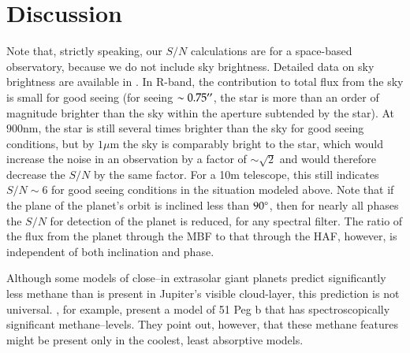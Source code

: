 \section{Discussion}
\label{micro_sec:discussion}
Note that, strictly speaking, our $S/N$ calculations are for a
space-based observatory, because we do not include sky brightness.
Detailed data on sky brightness are available in
\citet{leinert_et_al1998}.  In R-band, the contribution to total flux
from the sky is small for good seeing (for seeing $\sim0.75\mbox{$^{\prime\prime}$}$,
the star is more than an order of magnitude brighter than the sky
within the aperture subtended by the star).  At $900$nm, the star is
still several times brighter than the sky for good seeing conditions,
but by $1\mu$m the sky is comparably bright to the star, which would
increase the noise in an observation by a factor of $\sim\sqrt{2}$ and
would therefore decrease the $S/N$ by the same factor.  For a 10m
telescope, this still indicates $S/N\sim6$ for good seeing conditions
in the situation modeled above.  Note that if the plane of the
planet's orbit is inclined less than $90\mbox{$^\circ$}$, then for nearly all
phases the $S/N$ for detection of the planet is reduced, for any
spectral filter.  The ratio of the flux from the planet through the
MBF to that through the HAF, however, is independent of both
inclination and phase.

Although some models of close--in extrasolar giant planets predict
significantly less methane than is present in Jupiter's visible
cloud-layer, this prediction is not universal.
\citet{seager_et_al2000}, for example, present a model of 51 Peg b
that has spectroscopically significant methane--levels.  They point
out, however, that these methane features might be present only in the
coolest, least absorptive models.

